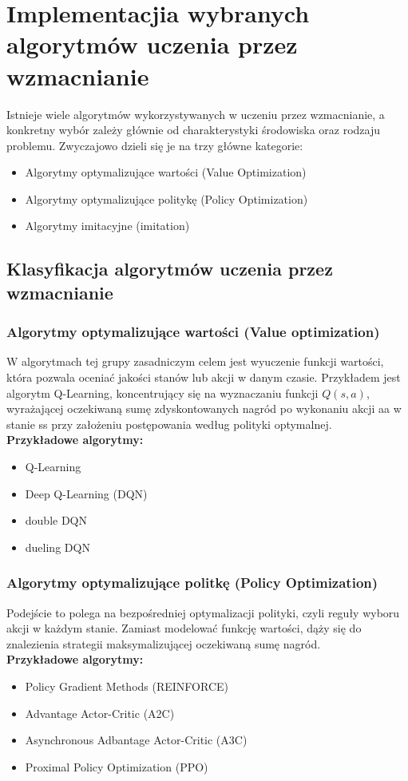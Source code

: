 \documentclass[a4paper, 12pt]{article}
\numberwithin{equation}{section}
\begin{document}
    \section{Implementacjia wybranych algorytmów uczenia przez wzmacnianie}
    Istnieje wiele algorytmów wykorzystywanych w uczeniu przez wzmacnianie, a konkretny wybór zależy głównie od charakterystyki środowiska oraz rodzaju problemu. Zwyczajowo dzieli się je na trzy główne kategorie:
    \begin{itemize}
        \item Algorytmy optymalizujące wartości (Value Optimization)
        \item Algorytmy optymalizujące politykę (Policy Optimization)
        \item Algorytmy imitacyjne (imitation)
    \end{itemize}
    \subsection{Klasyfikacja algorytmów uczenia przez wzmacnianie}
    \subsubsection{Algorytmy optymalizujące wartości (Value optimization)}
    W algorytmach tej grupy zasadniczym celem jest wyuczenie funkcji wartości, która pozwala oceniać jakości stanów lub akcji w danym czasie. Przykładem jest algorytm Q-Learning, koncentrujący się na wyznaczaniu funkcji \( Q(s,a) \), wyrażającej oczekiwaną sumę zdyskontowanych nagród po wykonaniu akcji aa w stanie ss przy założeniu postępowania według polityki optymalnej.
    \\ \textbf{Przykładowe algorytmy:}
    \begin{itemize}
        \item Q-Learning
        \item Deep Q-Learning (DQN)
        \item double DQN
        \item dueling DQN
    \end{itemize}
    \subsubsection{Algorytmy optymalizujące politkę (Policy Optimization)}
    Podejście to polega na bezpośredniej optymalizacji polityki, czyli reguły wyboru akcji w każdym stanie. Zamiast modelować funkcję wartości, dąży się do znalezienia strategii maksymalizującej oczekiwaną sumę nagród.
    \\ \textbf{Przykładowe algorytmy:}
    \begin{itemize}
        \item Policy Gradient Methods (REINFORCE)
        \item Advantage Actor-Critic (A2C)
        \item Asynchronous Adbantage Actor-Critic (A3C)
        \item Proximal Policy Optimization (PPO)
    \end{itemize}
\end{document}
